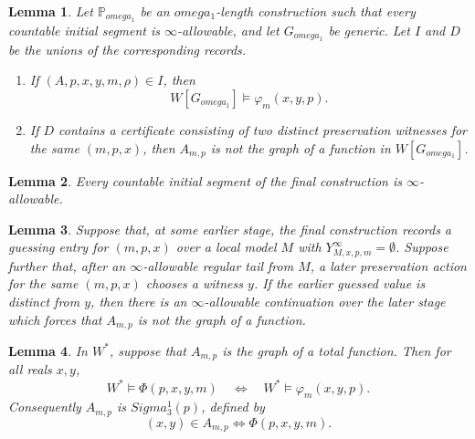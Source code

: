 \documentclass[10pt,a4paper]{amsart}
\newtheorem{lemma}{Lemma}
\def\Sigma{Sigma}%
\newcommand{\forceP}{\mathbb{P}}
\def\omega{omega}%
\begin{document}
\begin{lemma}\label{lem:final-persistence}
Let $\forceP_{\omega_1}$ be an $\omega_1$-length construction such that every
countable initial segment is $\infty$-allowable, and let $G_{\omega_1}$ be
generic. Let $I$ and $D$ be the unions of the corresponding records.
\begin{enumerate}[label=\textup{(\arabic*)}]
\item If $(A,p,x,y,m,\rho)\in I$, then
\[
   W[G_{\omega_1}]\models\varphi_m(x,y,p).
\]
\item If $D$ contains a certificate consisting of two distinct preservation
witnesses for the same $(m,p,x)$, then $A_{m,p}$ is not the graph of a function in
$W[G_{\omega_1}]$.
\end{enumerate}
\end{lemma}

\begin{lemma}\label{lem:final-initial-segments}
Every countable initial segment of the final construction is $\infty$-allowable.
\end{lemma}

\begin{lemma}\label{lem:squaring}
Suppose that, at some earlier stage, the final construction records a guessing
entry for $(m,p,x)$ over a local model $M$ with
$Y^\infty_{M,x,p,m}=\emptyset$. Suppose further that, after an
$\infty$-allowable regular tail from $M$, a later preservation action for the
same $(m,p,x)$ chooses a witness $y$. If the earlier guessed value is distinct
from $y$, then there is an $\infty$-allowable continuation over the later stage
which forces that $A_{m,p}$ is not the graph of a function.
\end{lemma}

\begin{lemma}\label{lem:no-junk}
In $W^*$, suppose that $A_{m,p}$ is the graph of a total function. Then for all
reals $x,y$,
\[
   W^*\models\Phi(p,x,y,m)
   \quad\Longleftrightarrow\quad
   W^*\models\varphi_m(x,y,p).
\]
Consequently $A_{m,p}$ is $\Sigma^1_3(p)$, defined by
\[
   (x,y)\in A_{m,p}\iff \Phi(p,x,y,m).
\]
\end{lemma}
\end{document}
